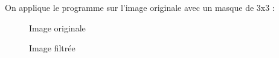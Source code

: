 \documentclass[french,a4paper,10pt]{article}
\begin{document}
    On applique le programme sur l'image originale avec un masque de 3x3 : %
    \begin{figure}[!htb]
        \begin{minipage}{0.48\textwidth}
            \centering
            \caption{Image originale}\label{Fig:peppers-grey-1}
        \end{minipage}\hfill
        \begin{minipage}{0.48\textwidth}
            \centering
            \caption{Image filtrée}\label{Fig:filtre-moyenneur-peppers-grey}
        \end{minipage}
    \end{figure}
\end{document}
